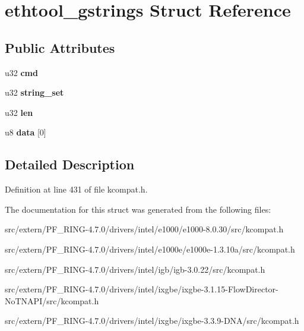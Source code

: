 \hypertarget{structethtool__gstrings}{
\section{ethtool\_\-gstrings Struct Reference}
\label{structethtool__gstrings}
}
\subsection*{Public Attributes}
\begin{DoxyCompactItemize}
\item 
\hypertarget{structethtool__gstrings_a77725daca197ccdbf67148cf1cf9722e}{
u32 {\bfseries cmd}}
\label{structethtool__gstrings_a77725daca197ccdbf67148cf1cf9722e}

\item 
\hypertarget{structethtool__gstrings_a94310ecfe4f4cf9592d2fa1890373d61}{
u32 {\bfseries string\_\-set}}
\label{structethtool__gstrings_a94310ecfe4f4cf9592d2fa1890373d61}

\item 
\hypertarget{structethtool__gstrings_a2e77f1dce29a2230783baa9fd8eb48e1}{
u32 {\bfseries len}}
\label{structethtool__gstrings_a2e77f1dce29a2230783baa9fd8eb48e1}

\item 
\hypertarget{structethtool__gstrings_a5ad7d3e53a99b96d847fd394bef039cb}{
u8 {\bfseries data} \mbox{[}0\mbox{]}}
\label{structethtool__gstrings_a5ad7d3e53a99b96d847fd394bef039cb}

\end{DoxyCompactItemize}


\subsection{Detailed Description}


Definition at line 431 of file kcompat.h.



The documentation for this struct was generated from the following files:\begin{DoxyCompactItemize}
\item 
src/extern/PF\_\-RING-\/4.7.0/drivers/intel/e1000/e1000-\/8.0.30/src/kcompat.h\item 
src/extern/PF\_\-RING-\/4.7.0/drivers/intel/e1000e/e1000e-\/1.3.10a/src/kcompat.h\item 
src/extern/PF\_\-RING-\/4.7.0/drivers/intel/igb/igb-\/3.0.22/src/kcompat.h\item 
src/extern/PF\_\-RING-\/4.7.0/drivers/intel/ixgbe/ixgbe-\/3.1.15-\/FlowDirector-\/NoTNAPI/src/kcompat.h\item 
src/extern/PF\_\-RING-\/4.7.0/drivers/intel/ixgbe/ixgbe-\/3.3.9-\/DNA/src/kcompat.h\end{DoxyCompactItemize}
